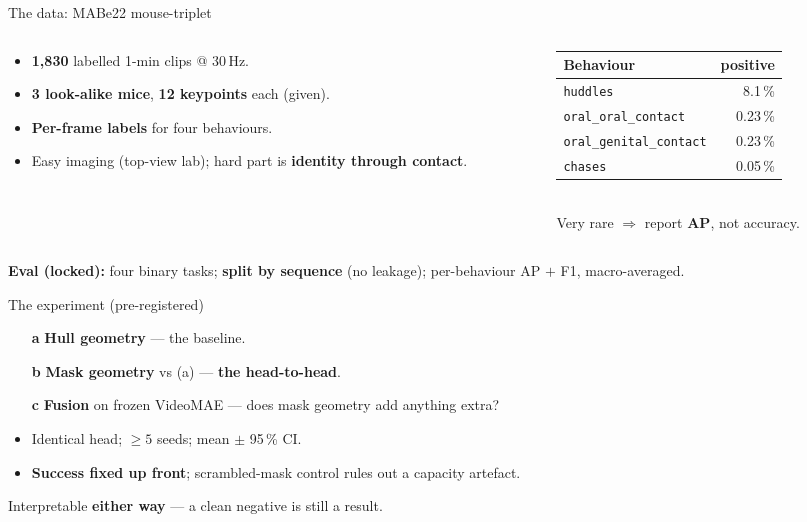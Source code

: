 \documentclass[aspectratio=169,11pt]{beamer}
\begin{document}
\begin{frame}{The data: MABe22 mouse-triplet}
\begin{columns}[T]
\begin{column}{0.56\textwidth}
\vspace{0.6em}
\begin{itemize}\itemsep0.5em
\item \textbf{1{,}830} labelled 1-min clips @ 30\,Hz.
\item \textbf{3 look-alike mice}, \textbf{12 keypoints} each (given).
\item \textbf{Per-frame labels} for four behaviours.
\item Easy imaging (top-view lab); hard part is \textbf{identity through contact}.
\end{itemize}
\end{column}
\begin{column}{0.44\textwidth}
\footnotesize
\begin{tabular}{@{}lr@{}}
\textbf{Behaviour} & \textbf{positive} \\\hline
\texttt{huddles}              & 8.1\,\% \\
\texttt{oral\_oral\_contact}  & 0.23\,\% \\
\texttt{oral\_genital\_contact} & 0.23\,\% \\
\texttt{chases}               & 0.05\,\% \\
\end{tabular}
\vspace{0.5em}\\
      Very rare $\Rightarrow$ report \textbf{AP}, not accuracy.
\end{column}
\end{columns}
\vspace{0.5em}
\footnotesize\textbf{Eval (locked):} four binary tasks; \textbf{split by sequence} (no leakage);
per-behaviour AP $+$ F1, macro-averaged.
\end{frame}
\begin{frame}{The experiment (pre-registered)}
\begin{enumerate}\itemsep0.6em
\item[\textbf{a}] \textbf{Hull geometry} — the baseline.
\item[\textbf{b}] \textbf{Mask geometry} vs (a) — \textcolor{burnt}{\textbf{the head-to-head}}.
\item[\textbf{c}] \textbf{Fusion} on frozen VideoMAE — does mask geometry add anything extra?
\end{enumerate}
\vspace{0.5em}
\begin{itemize}\itemsep0.4em
\item Identical head; $\geq 5$ seeds; mean $\pm$ 95\,\% CI.
\item \textbf{Success fixed up front}; scrambled-mask control rules out a capacity artefact.
\end{itemize}
\vspace{0.3em}
\begin{block}{}
\centering Interpretable \textbf{either way} — a clean negative is still a result.
\end{block}
\end{frame}
\end{document}
